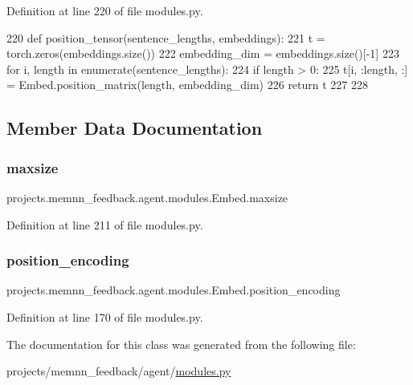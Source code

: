 Definition at line 220 of file modules.\+py.


\begin{DoxyCode}
220     \textcolor{keyword}{def }position\_tensor(sentence\_lengths, embeddings):
221         t = torch.zeros(embeddings.size())
222         embedding\_dim = embeddings.size()[-1]
223         \textcolor{keywordflow}{for} i, length \textcolor{keywordflow}{in} enumerate(sentence\_lengths):
224             \textcolor{keywordflow}{if} length > 0:
225                 t[i, :length, :] = Embed.position\_matrix(length, embedding\_dim)
226         \textcolor{keywordflow}{return} t
227 
228 
\end{DoxyCode}


\subsection{Member Data Documentation}
\mbox{\label{classprojects_1_1memnn__feedback_1_1agent_1_1modules_1_1Embed_a8daadcc50f9245d9814a62a860f10de9}} 
\subsubsection{\texorpdfstring{maxsize}{maxsize}}
{\footnotesize\ttfamily projects.\+memnn\+\_\+feedback.\+agent.\+modules.\+Embed.\+maxsize\hspace{0.3cm}{\ttfamily [static]}}



Definition at line 211 of file modules.\+py.

\mbox{\label{classprojects_1_1memnn__feedback_1_1agent_1_1modules_1_1Embed_a53464118dd2c6052e8ce44978c573c27}} 
\subsubsection{\texorpdfstring{position\+\_\+encoding}{position\_encoding}}
{\footnotesize\ttfamily projects.\+memnn\+\_\+feedback.\+agent.\+modules.\+Embed.\+position\+\_\+encoding}



Definition at line 170 of file modules.\+py.



The documentation for this class was generated from the following file\+:\begin{DoxyCompactItemize}
\item 
projects/memnn\+\_\+feedback/agent/\hyperlink{projects_2memnn__feedback_2agent_2modules_8py}{modules.\+py}\end{DoxyCompactItemize}

